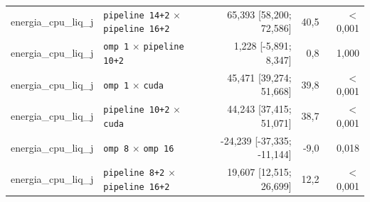 \begin{tabular}{llrrr}
energia\_cpu\_liq\_j & \texttt{pipeline 14+2} $\times$ \texttt{pipeline 16+2} & 65,393 [58,200; 72,586] & 40,5 & $<$0,001 \\
energia\_cpu\_liq\_j & \texttt{omp 1} $\times$ \texttt{pipeline 10+2} & 1,228 [-5,891; 8,347] & 0,8 & 1,000 \\
energia\_cpu\_liq\_j & \texttt{omp 1} $\times$ \texttt{cuda} & 45,471 [39,274; 51,668] & 39,8 & $<$0,001 \\
energia\_cpu\_liq\_j & \texttt{pipeline 10+2} $\times$ \texttt{cuda} & 44,243 [37,415; 51,071] & 38,7 & $<$0,001 \\
energia\_cpu\_liq\_j & \texttt{omp 8} $\times$ \texttt{omp 16} & -24,239 [-37,335; -11,144] & -9,0 & 0,018 \\
energia\_cpu\_liq\_j & \texttt{pipeline 8+2} $\times$ \texttt{pipeline 16+2} & 19,607 [12,515; 26,699] & 12,2 & $<$0,001 \\
\hline
\end{tabular}
